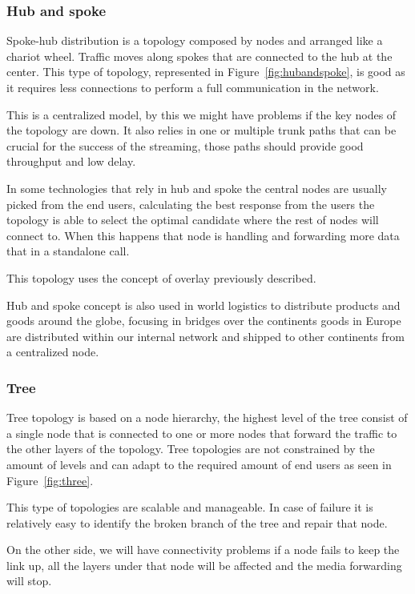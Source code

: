 \subsubsection{Hub and spoke}

Spoke-hub distribution is a topology composed by nodes and arranged like a chariot wheel. Traffic moves along spokes that are connected to the hub at the center. This type of topology, represented in Figure~\ref{fig:hubandspoke}, is good as it requires less connections to perform a full communication in the network. 

This is a centralized model, by this we might have problems if the key nodes of the topology are down. It also relies in one or multiple trunk paths that can be crucial for the success of the streaming, those paths should provide good throughput and low delay.

In some technologies that rely in hub and spoke the central nodes are usually picked from the end users, calculating the best response from the users the topology is able to select the optimal candidate where the rest of nodes will connect to. When this happens that node is handling and forwarding more data that in a standalone call.

This topology uses the concept of overlay previously described.

Hub and spoke concept is also used in world logistics to distribute products and goods around the globe, focusing in bridges over the continents goods in Europe are distributed within our internal network and shipped to other continents from a centralized node.  

\subsubsection{Tree}
 
Tree topology is based on a node hierarchy, the highest level of the tree consist of a single node that is connected to one or more nodes that forward the traffic to the other layers of the topology. Tree topologies are not constrained by the amount of levels and can adapt to the required amount of end users as seen in Figure~\ref{fig:three}.  

This type of topologies are scalable and manageable. In case of failure it is relatively easy to identify the broken branch of the tree and repair that node.

On the other side, we will have connectivity problems if a node fails to keep the link up, all the layers under that node will be affected and the media forwarding will stop.

